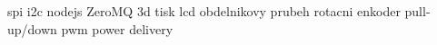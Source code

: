 spi
i2c
nodejs
ZeroMQ
3d tisk
lcd
obdelnikovy prubeh
rotacni enkoder
pull-up/down
pwm
power delivery